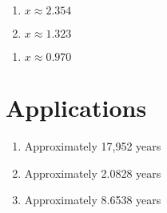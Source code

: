 \begin{multicols}{2}
\begin{enumerate}	\setcounter{enumi}{\value{Review}}
    \item $x \approx 2.354$
    \item $x \approx 1.323$
\end{enumerate} \setcounter{Review}{\value{enumi}}
\end{multicols}
\begin{multicols}{2}
\begin{enumerate}	\setcounter{enumi}{\value{Review}}
    \item $x \approx 0.970$
\end{enumerate}
\end{multicols}

\section*{Applications}

\begin{enumerate}
	\item Approximately 17,952 years
	\item Approximately 2.0828 years
    \item Approximately 8.6538 years
\end{enumerate}